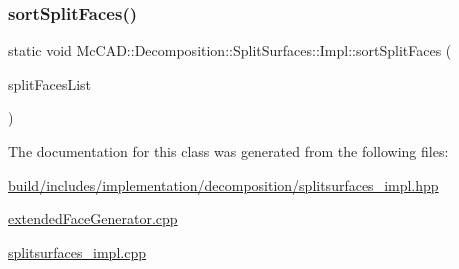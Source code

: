\subsubsection{\texorpdfstring{sort\+Split\+Faces()}{sortSplitFaces()}\hspace{0.1cm}{\footnotesize\ttfamily [2/2]}}
{\footnotesize\ttfamily static void Mc\+C\+A\+D\+::\+Decomposition\+::\+Split\+Surfaces\+::\+Impl\+::sort\+Split\+Faces (\begin{DoxyParamCaption}\item[{std\+::vector$<$ std\+::shared\+\_\+ptr$<$ \hyperlink{classMcCAD_1_1Geometry_1_1BoundSurface}{Geometry\+::\+Bound\+Surface} $>$$>$ \&}]{split\+Faces\+List }\end{DoxyParamCaption})\hspace{0.3cm}{\ttfamily [static]}}



The documentation for this class was generated from the following files\+:\begin{DoxyCompactItemize}
\item 
\hyperlink{build_2includes_2implementation_2decomposition_2splitsurfaces__impl_8hpp}{build/includes/implementation/decomposition/splitsurfaces\+\_\+impl.\+hpp}\item 
\hyperlink{extendedFaceGenerator_8cpp}{extended\+Face\+Generator.\+cpp}\item 
\hyperlink{splitsurfaces__impl_8cpp}{splitsurfaces\+\_\+impl.\+cpp}\end{DoxyCompactItemize}
